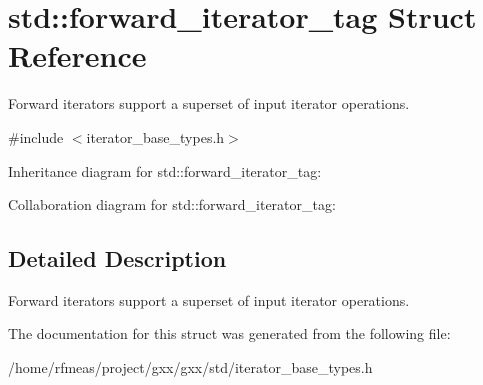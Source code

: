 \hypertarget{structstd_1_1forward__iterator__tag}{}\section{std\+:\+:forward\+\_\+iterator\+\_\+tag Struct Reference}
\label{structstd_1_1forward__iterator__tag}


Forward iterators support a superset of input iterator operations.  




{\ttfamily \#include $<$iterator\+\_\+base\+\_\+types.\+h$>$}



Inheritance diagram for std\+:\+:forward\+\_\+iterator\+\_\+tag\+:


Collaboration diagram for std\+:\+:forward\+\_\+iterator\+\_\+tag\+:


\subsection{Detailed Description}
Forward iterators support a superset of input iterator operations. 

The documentation for this struct was generated from the following file\+:\begin{DoxyCompactItemize}
\item 
/home/rfmeas/project/gxx/gxx/std/iterator\+\_\+base\+\_\+types.\+h\end{DoxyCompactItemize}
